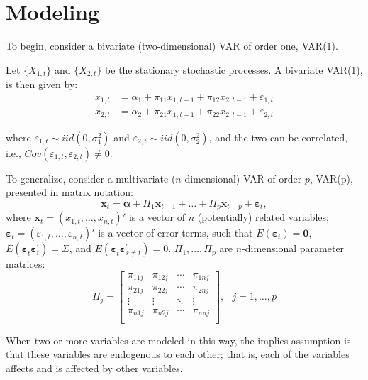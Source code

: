 \documentclass[
  12pt,
  oneside]{book}
\begin{document}
\hypertarget{modeling-2}{%
\section{Modeling}\label{modeling-2}}

To begin, consider a bivariate (two-dimensional) VAR of order one, VAR(1).

Let \(\{X_{1,t}\}\) and \(\{X_{2,t}\}\) be the stationary stochastic processes. A bivariate VAR(1), is then given by:
\[\begin{aligned}
x_{1,t} &= \alpha_1 + \pi_{11}x_{1,t-1} + \pi_{12}x_{2,t-1} + \varepsilon_{1,t} \\
x_{2,t} &= \alpha_2 + \pi_{21}x_{1,t-1} + \pi_{22}x_{2,t-1} + \varepsilon_{2,t}
\end{aligned}\]

where \(\varepsilon_{1,t} \sim iid(0,\sigma_1^2)\) and \(\varepsilon_{2,t} \sim iid(0,\sigma_2^2)\), and the two can be correlated, i.e., \(Cov(\varepsilon_{1,t},\varepsilon_{2,t}) \neq 0\).

To generalize, consider a multivariate (\(n\)-dimensional) VAR of order \(p\), VAR(p), presented in matrix notation: \[\mathbf{x}_t = \mathbf{\alpha} + \Pi_1 \mathbf{x}_{t-1} + \ldots + \Pi_p \mathbf{x}_{t-p} + \mathbf{\varepsilon}_t,\] where \(\mathbf{x}_t = (x_{1,t},\ldots,x_{n,t})'\) is a vector of \(n\) (potentially) related variables; \(\mathbf{\varepsilon}_t = (\varepsilon_{1,t},\ldots,\varepsilon_{n,t})'\) is a vector of error terms, such that \(E(\mathbf{\varepsilon}_t) = \mathbf{0}\), \(E(\mathbf{\varepsilon}_t^{}\mathbf{\varepsilon}_t^{\prime}) = \Sigma\), and \(E(\mathbf{\varepsilon}_{t}^{}\mathbf{\varepsilon}_{s \neq t}^{\prime}) = 0\). \(\Pi_1,\ldots,\Pi_p\) are \(n\)-dimensional parameter matrices:
\[\Pi_j = 
        \left[ 
        \begin{array}{cccc} 
        \pi_{11j} & \pi_{12j} & \cdots &  \pi_{1nj} \\ 
        \pi_{21j} & \pi_{22j} & \cdots &  \pi_{2nj} \\  
        \vdots & \vdots & \ddots &  \vdots \\  
        \pi_{n1j} & \pi_{n2j} & \cdots &  \pi_{nnj} \\  
        \end{array} 
        \right],\;~~j=1,\ldots,p\]

When two or more variables are modeled in this way, the implies assumption is that these variables are endogenous to each other; that is, each of the variables affects and is affected by other variables.
\end{document}
